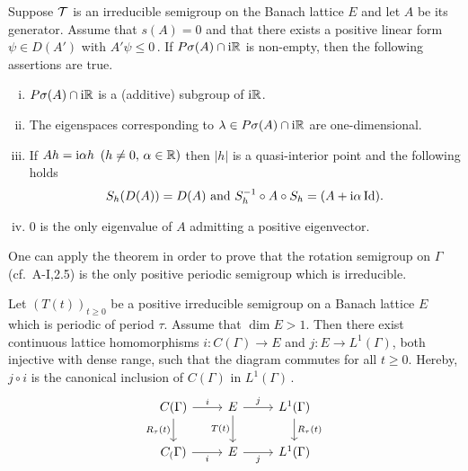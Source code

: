 \begin{theorem}\label{thm:c3-3.8}
	
	Suppose $\mathcal{T}$ is an irreducible semigroup on the Banach lattice $E$ and let $A$ be its generator.
	Assume that $s(A) = 0$ and that there exists a positive linear form $\psi \in D(A')$ with $A'\psi \leq 0$\,.
%
If $P\sigma(A)\cap \mathrm{i}\mathbb{R} $ is non-empty, then the following assertions are true.
	\begin{enumerate}[(i), wide]
		\item 
			$P\sigma(A)\cap \mathrm{i}\mathbb{R} $ is a (additive) subgroup of $\mathrm{i}\mathbb{R} $.
	
		\item 
		The eigenspaces corresponding to $\lambda \in P\sigma(A)\cap \mathrm{i}\mathbb{R} $ are one-dimensional.
	
		\item 
		If $Ah = \mathrm{i}\alpha h$ $(h \neq 0,\, \alpha \in \mathbb{R} )$ then $|h|$ is a quasi-interior point and the following holds
		\begin{equation}\label{eq:c3-3.13}
			S_{h}(D(A)) = D(A) \text{ and } S_{h}^{-1}\circ A\circ S_{h} = (A + \mathrm{i}\alpha\operatorname{Id}).
		\end{equation}
		
		\item 
		$0$ is the only eigenvalue of $A$ admitting a positive eigenvector.

	\end{enumerate}
\end{theorem}

One can apply the theorem in order to prove that the rotation semigroup on $\Gamma$ (cf.\ A-I,2.5) is the only positive periodic semigroup which is irreducible.

\begin{corollary}\label{cor:c3-3.9}
	
	Let $(T(t))_{t\geq 0}$ be a positive irreducible semigroup on a Banach lattice $E$ which is periodic of period $\tau$.
	Assume that $\dim E > 1$.
	Then there exist continuous lattice homomorphisms
	$i \colon C(\Gamma) \to E$ and $j \colon E \to L^{1}(\Gamma)$,
	both injective with dense range,
	such that the diagram commutes for all $t\geq 0$.
	Hereby, $j\circ i$ is the canonical inclusion of $C(\Gamma)$ in $L^{1}(\Gamma)$\,.
	\[ 
	\begin{tikzcd}
		C(\Gamma) \arrow[r, "i"] \arrow[d, "R_\tau(t)"'] & E  \arrow[r, "j"] \arrow[d, "T(t)"'] & L^1(\Gamma) \arrow[d, "R_\tau(t)"] \\
		C_(\Gamma) \arrow[r, "i"'] & E \arrow[r, "j"'] & L^{1}(\Gamma)
	\end{tikzcd}
	\]
\end{corollary}
	
